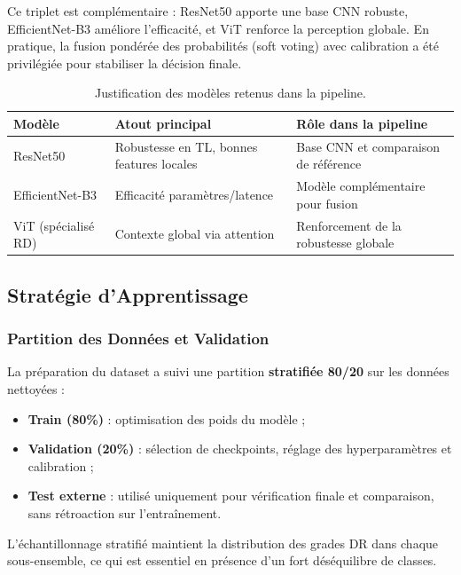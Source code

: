 \documentclass[12pt,a4paper,oneside]{report}
\begin{document}
Ce triplet est complémentaire : ResNet50 apporte une base CNN robuste,
EfficientNet-B3 améliore l'efficacité, et ViT renforce la perception
globale. En pratique, la fusion pondérée des probabilités (soft voting)
avec calibration a été privilégiée pour stabiliser la décision finale.

\begin{table}[H]
\centering
\caption{Justification des modèles retenus dans la pipeline.}
\label{tab:choix_modeles}
\begin{tabular}{|l|l|l|}
\hline
\textbf{Modèle} & \textbf{Atout principal} & \textbf{Rôle dans la pipeline} \\
\hline
ResNet50 & Robustesse en TL, bonnes features locales & Base CNN et comparaison de référence \\
\hline
EfficientNet-B3 & Efficacité paramètres/latence & Modèle complémentaire pour fusion \\
\hline
ViT (spécialisé RD) & Contexte global via attention & Renforcement de la robustesse globale \\
\hline
\end{tabular}
\end{table}

\subsection{Stratégie d'Apprentissage}

\subsubsection{Partition des Données et Validation}

La préparation du dataset a suivi une partition \textbf{stratifiée 80/20}
sur les données nettoyées :

\begin{itemize}
    \item \textbf{Train (80\%)} : optimisation des poids du modèle ;
    \item \textbf{Validation (20\%)} : sélection de checkpoints,
        réglage des hyperparamètres et calibration ;
    \item \textbf{Test externe} : utilisé uniquement pour vérification
        finale et comparaison, sans rétroaction sur l'entraînement.
\end{itemize}

L'échantillonnage stratifié maintient la distribution des grades DR dans
chaque sous-ensemble, ce qui est essentiel en présence d'un fort
déséquilibre de classes.
\end{document}

